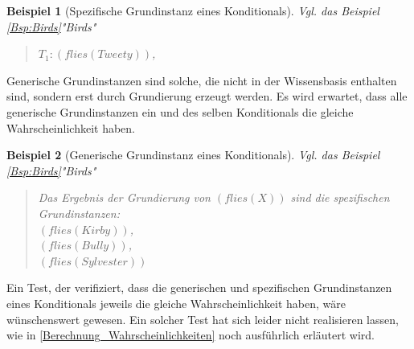 \documentclass[a4paper, 11pt]{book}
\newtheorem{Bsp}{Beispiel}[section]
\begin{document}
{\label{Bsp:Spez Grundinstanz} 
\begin{Bsp}[Spezifische Grundinstanz eines Konditionals]
	
	Vgl. das Beispiel \ref{Bsp:Birds}"{}Birds"{}
	\begin{quote}
		$ T_{1}  :  (flies(Tweety)) $,\\
	\end{quote}
\end{Bsp}

Generische Grundinstanzen sind solche, die nicht in der Wissensbasis enthalten sind, sondern erst durch Grundierung erzeugt werden. 
Es wird erwartet, dass alle generische Grundinstanzen ein und des selben Konditionals die gleiche Wahrscheinlichkeit haben.

\label{Bsp:Gen Grundinstanz} 
\begin{Bsp}[Generische Grundinstanz eines Konditionals]
	
	Vgl. das Beispiel \ref{Bsp:Birds}"{}Birds"{}
	\begin{quote}
		Das Ergebnis der Grundierung von $ (flies(X)) $ sind die spezifischen Grundinstanzen:\\
		$ (flies(Kirby)) $,\\
		$ (flies(Bully)) $,\\
		$ (flies(Sylvester)) $\\
		
	\end{quote}
\end{Bsp}

Ein Test, der verifiziert, dass die generischen und spezifischen Grundinstanzen eines Konditionals jeweils die gleiche Wahrscheinlichkeit haben, wäre wünschenswert gewesen. Ein solcher Test hat sich leider nicht realisieren lassen, wie in \ref{Berechnung_Wahrscheinlichkeiten} noch ausführlich erläutert wird.


}
\end{document}

